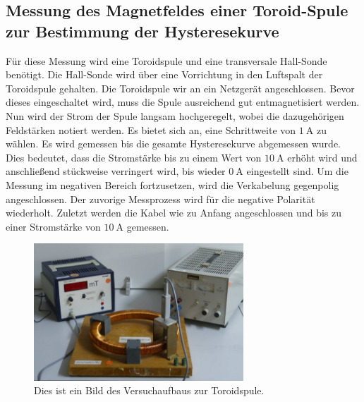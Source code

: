 \subsection{Messung des Magnetfeldes einer Toroid-Spule zur Bestimmung der Hysteresekurve}
\label{subsec:D_Hysterese}
Für diese Messung wird eine Toroidspule und eine transversale Hall-Sonde benötigt. Die Hall-Sonde wird über eine Vorrichtung in den Luftspalt der Toroidspule gehalten. Die Toroidspule
wir an ein Netzgerät angeschlossen. Bevor dieses eingeschaltet wird, muss die Spule ausreichend gut entmagnetisiert werden. Nun wird der Strom
der Spule langsam hochgeregelt, wobei die dazugehörigen Feldstärken notiert werden. Es bietet sich an, eine Schrittweite von $1 \: \unit{\ampere}$ zu wählen. Es wird gemessen bis die 
gesamte Hysteresekurve abgemessen wurde. Dies bedeutet, dass die Stromstärke bis zu einem Wert von $10 \: \unit{\ampere}$ erhöht wird und anschließend stückweise verringert wird, bis
wieder $0 \: \unit{\ampere}$ eingestellt sind.
Um die Messung im negativen Bereich fortzusetzen, wird die Verkabelung gegenpolig angeschlossen. Der zuvorige Messprozess wird für die negative Polarität wiederholt. 
Zuletzt werden die Kabel wie zu Anfang angeschlossen und bis zu einer Stromstärke von $10 \: \unit{\ampere}$ gemessen.
\begin{figure}
    \centering
    \caption{Dies ist ein Bild des Versuchaufbaus zur Toroidspule.\cite{v308}}
    \label{fig:Aufbau_Toroid}
    \includegraphics[width=0.7\textwidth]{content/RingSpuleAufbau.PNG}
\end{figure}